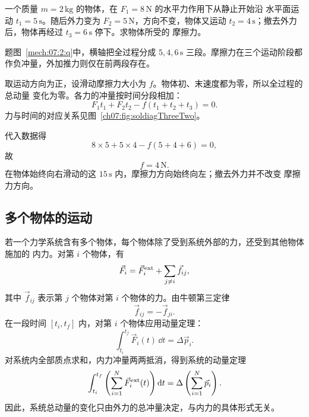 {\begin{origexamplebox}{}\label{ch07:ex:s07-3-2}
一个质量 $m=2\,\mathrm{kg}$ 的物体，在 $F_1=8\,\mathrm N$ 的水平力作用下从静止开始沿
水平面运动 $t_1=5\,\mathrm s$。随后外力变为 $F_2=5\,\mathrm N$，方向不变，物体又运动
$t_2=4\,\mathrm s$；撤去外力后，物体再经过 $t_3=6\,\mathrm s$ 停下。求物体所受的
摩擦力。

\begin{qualityfigure}
\label{mech:07:2:q}
\end{qualityfigure}
\end{origexamplebox}

\begin{xesolution}题图~\ref{mech:07:2:q}中，横轴把全过程分成 $5,4,6\,\mathrm s$ 三段。摩擦力在三个运动阶段都作负冲量，外加推力则仅在前两段存在。

取运动方向为正，设滑动摩擦力大小为 $f$。物体初、末速度都为零，所以全过程的总动量
变化为零。各力的冲量按时间分段相加：
\[
 F_1t_1+F_2t_2-f(t_1+t_2+t_3)=0.
\]
力与时间的对应关系见图~\ref{ch07:fig:soldiagThreeTwo}。

\soldiagThreeTwo
代入数据得
\[
 8\times5+5\times4-f(5+4+6)=0,
\]
故
\[
 \boxed{f=4\,\mathrm N}.
\]
在物体始终向右滑动的这 $15\,\mathrm s$ 内，摩擦力方向始终向左；撤去外力并不改变
摩擦力方向。
\end{xesolution}

\subsection{多个物体的运动}

若一个力学系统含有多个物体，每个物体除了受到系统外部的力，还受到其他物体施加的
内力。对第 $i$ 个物体，有
\begin{equation}
 \vec F_i=\vec F_i^{\rm ext}+\sum_{j\ne i}\vec f_{ij},
\end{equation}
其中 $\vec f_{ij}$ 表示第 $j$ 个物体对第 $i$ 个物体的力。由牛顿第三定律
\begin{equation}
 \vec f_{ij}=-\vec f_{ji}.
\end{equation}
在一段时间 $[t_i,t_f]$ 内，对第 $i$ 个物体应用动量定理：
\begin{equation}
 \int_{t_i}^{t_f}\vec F_i(t)\,\dd t=\Delta\vec p_i.
\end{equation}
对系统内全部质点求和，内力冲量两两抵消，得到系统的动量定理
\begin{equation}
 \int_{t_i}^{t_f}\left(\sum_{i=1}^{N}\vec F_i^{\rm ext}(t)\right)\mathop{}\!\mathrm d t
 =\Delta\left(\sum_{i=1}^{N}\vec p_i\right).
\end{equation}
因此，系统总动量的变化只由外力的总冲量决定，与内力的具体形式无关。

}
